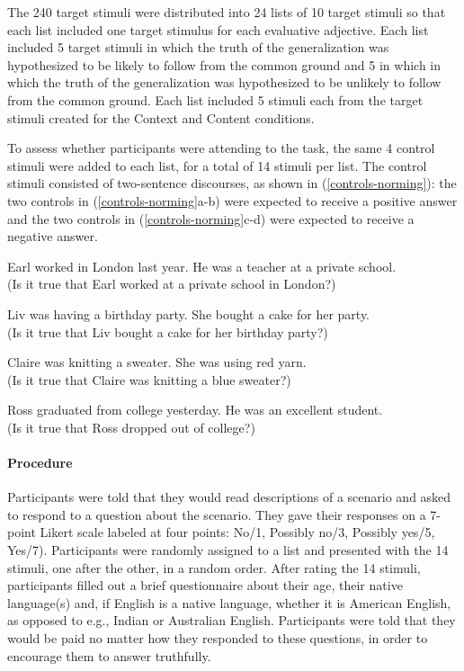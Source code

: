 \documentclass[11pt,fleqn]{article}
\newcommand{\6}{\mbox{$[\hspace*{-.6mm}[$}}
\newcommand{\9}{\mbox{$]\hspace*{-.6mm}]$}}
\begin{document}
The 240 target stimuli were distributed into 24 lists of 10 target stimuli so that each list included one target stimulus for each evaluative adjective. Each list included 5 target stimuli in which the truth of the generalization was hypothesized to be likely to follow from the common ground and 5 in which in which the truth of the generalization was hypothesized to be unlikely to follow from the common ground. Each list included 5 stimuli each from the target stimuli created for the Context and Content conditions.

To assess whether participants were attending to the task, the same 4 control stimuli were added to each list, for a total of 14 stimuli per list. The control stimuli consisted of two-sentence discourses, as shown in (\ref{controls-norming}): the two controls in (\ref{controls-norming}a-b) were expected to receive a positive answer and the two controls in (\ref{controls-norming}c-d) were expected to receive a negative answer.

\begin{exe}
\ex\label{controls-norming}
\begin{xlist}
\ex Earl worked in London last year. He was a teacher at a private school. 
\\ (Is it true that Earl worked at a private school in London?)

\ex Liv was having a birthday party. She bought a cake for her party.
\\ (Is it true that Liv bought a cake for her birthday party?)

\ex Claire was knitting a sweater. She was using red yarn. 
\\ (Is it true that Claire was knitting a blue sweater?)

\ex Ross graduated from college yesterday. He was an excellent student. 
\\ (Is it true that Ross dropped out of college?)

\end{xlist}
\end{exe}

\paragraph{Procedure}

Participants were told that they would read descriptions of a scenario and asked to respond to a question about the scenario. They gave their responses on a 7-point Likert scale labeled at four points: No/1, Possibly no/3, Possibly yes/5,
Yes/7). Participants were randomly assigned to a list and presented with the 14 stimuli, one after the other, in a random order. After rating the 14 stimuli, participants filled out a brief questionnaire about their age, their native language(s) and, if English is a native language, whether it is American English, as opposed to e.g., Indian or Australian English. Participants were told that they would be paid no matter how they
responded to these questions, in order to encourage them to answer
truthfully.
\end{document}
